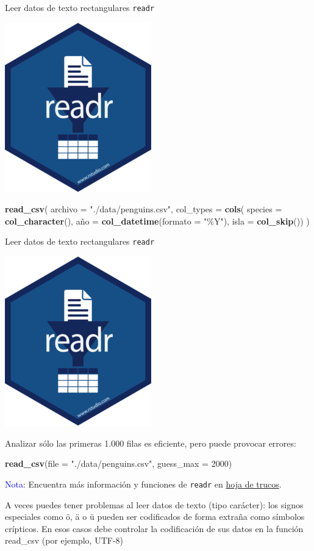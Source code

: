 \documentclass[
  ignorenonframetext,
  aspectratio=169]{beamer}
\newenvironment{Shaded}{\begin{snugshade}}{\end{snugshade}}
\newcommand{\AttributeTok}[1]{\textcolor[rgb]{0.13,0.29,0.53}{#1}}
\newcommand{\DecValTok}[1]{\textcolor[rgb]{0.00,0.00,0.81}{#1}}
\newcommand{\FunctionTok}[1]{\textcolor[rgb]{0.13,0.29,0.53}{\textbf{#1}}}
\newcommand{\NormalTok}[1]{#1}
\newcommand{\OtherTok}[1]{\textcolor[rgb]{0.56,0.35,0.01}{#1}}
\newcommand{\StringTok}[1]{\textcolor[rgb]{0.31,0.60,0.02}{#1}}
\newcommand\blue[1]{\textcolor{blue}{#1}}
\begin{document}
\begin{frame}[fragile]{Leer datos de texto rectangulares \texttt{readr}}
\label{leer-datos-de-texto-rectangulares-readr-8}
\begin{flushright}\includegraphics[width=0.05\linewidth]{Imgs/logo_readr} \end{flushright}

\begin{Shaded}
\begin{Highlighting}[]
\FunctionTok{read\_csv}\NormalTok{(}
  \AttributeTok{archivo =} \StringTok{"./data/penguins.csv"}\NormalTok{,}
  \AttributeTok{col\_types =} \FunctionTok{cols}\NormalTok{(}
    \AttributeTok{species =} \FunctionTok{col\_character}\NormalTok{(),}
\NormalTok{    año }\OtherTok{=} \FunctionTok{col\_datetime}\NormalTok{(}\AttributeTok{formato =} \StringTok{"\%Y"}\NormalTok{),}
    \AttributeTok{isla =} \FunctionTok{col\_skip}\NormalTok{())}
\NormalTok{  )}
\end{Highlighting}
\end{Shaded}
\end{frame}

\begin{frame}[fragile]{Leer datos de texto rectangulares \texttt{readr}}
\label{leer-datos-de-texto-rectangulares-readr-9}
\begin{flushright}\includegraphics[width=0.05\linewidth]{Imgs/logo_readr} \end{flushright}

Analizar sólo las primeras 1.000 filas es eficiente, pero puede provocar
errores:

\begin{Shaded}
\begin{Highlighting}[]
\FunctionTok{read\_csv}\NormalTok{(}\AttributeTok{file =} \StringTok{"./data/penguins.csv"}\NormalTok{, }\AttributeTok{guess\_max =} \DecValTok{2000}\NormalTok{)}
\end{Highlighting}
\end{Shaded}

\blue{Nota}: Encuentra más información y funciones de \texttt{readr} en
\href{https://raw.githubusercontent.com/rstudio/cheatsheets/master/data-import.pdf}{hoja
de trucos}.

A veces puedes tener problemas al leer datos de texto (tipo carácter):
los signos especiales como ö, ä o ü pueden ser codificados de forma
extraña como símbolos crípticos. En esos casos debe controlar la
codificación de sus datos en la función read\_csv (por ejemplo, UTF-8)
\end{frame}
\end{document}

